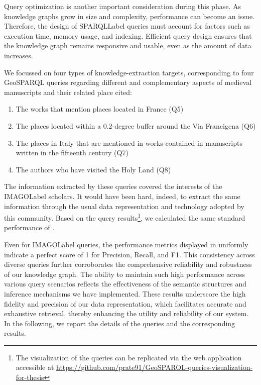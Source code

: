 Query optimization is another important consideration during this phase. As knowledge graphs grow in size and complexity, performance can become an issue. Therefore, the design of \acrshort{SPARQLLabel} queries must account for factors such as execution time, memory usage, and indexing. Efficient query design ensures that the knowledge graph remains responsive and usable, even as the amount of data increases.

We focussed on four types of knowledge-extraction targets, corresponding to four GeoSPARQL queries regarding different and complementary aspects of medieval manuscripts and their related place cited:
\begin{enumerate}
    \item The works that mention places located in France (Q5)
    \item The places located within a 0.2-degree buffer around the Via Francigena (Q6)
    \item The places in Italy that are mentioned in works contained in manuscripts written in the fifteenth century (Q7)
    \item The authors who have visited the Holy Land (Q8)
\end{enumerate}

The information extracted by these queries covered the interests of the \acrshort{IMAGOLabel} scholars. It would have been hard, indeed, to extract the same information through the usual data representation and technology adopted by this community. Based on the query results\footnote{The visualization of the queries can be replicated via the web application accessible at \url{https://github.com/prate91/GeoSPARQL-queries-visualization-for-thesis}}, we calculated the same standard performance of . 

Even for \acrshort{IMAGOLabel} queries, the performance metrics displayed in  uniformly indicate a perfect score of 1 for Precision, Recall, and F1. This consistency across diverse queries further corroborates the comprehensive reliability and robustness of our knowledge graph. The ability to maintain such high performance across various query scenarios reflects the effectiveness of the semantic structures and inference mechanisms we have implemented. These results underscore the high fidelity and precision of our data representation, which facilitates accurate and exhaustive retrieval, thereby enhancing the utility and reliability of our system. In the following, we report the details of the queries and the corresponding results.

